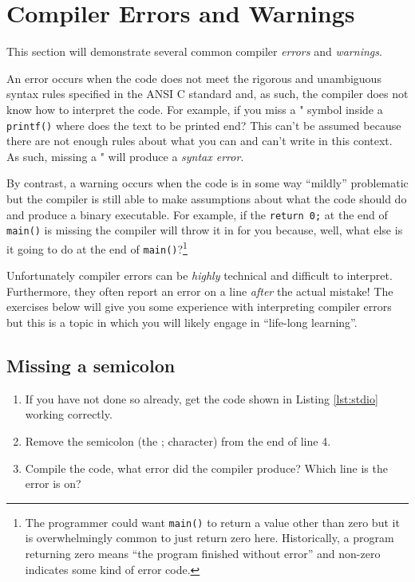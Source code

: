 \documentclass{lab}
\begin{document}
\pagebreak
\section{Compiler Errors and Warnings}

This section will demonstrate several common compiler \textit{errors} and \textit{warnings}.

An error occurs when the code does not meet the rigorous and unambiguous syntax rules specified in the ANSI C standard and, as such, the compiler does not know how to interpret the code. For example, if you miss a " symbol inside a \texttt{printf()} where does the text to be printed end? This can't be assumed because there are not enough rules about what you can and can't write in this context. As such, missing a " will produce a \textit{syntax error}.

By contrast, a warning occurs when the code is in some way ``mildly'' problematic but the compiler is still able to make assumptions about what the code should do and produce a binary executable. For example, if the \texttt{return 0;} at the end of \texttt{main()} is missing the compiler will throw it in for you because, well, what else is it going to do at the end of \texttt{main()}?\footnote{The programmer could want \texttt{main()} to return a value other than zero but it is overwhelmingly common to just return zero here. Historically, a program returning zero means ``the program finished without error'' and non-zero indicates some kind of error code.}

Unfortunately compiler errors can be \textit{highly} technical and difficult to interpret. Furthermore, they often report an error on a line \textit{after} the actual mistake! The exercises below will give you some experience with interpreting compiler errors but this is a topic in which you will likely engage in ``life-long learning''.

\subsection{Missing a semicolon}

\begin{task}{}{}
\begin{enumerate}
	\item If you have not done so already, get the code shown in Listing \ref{lst:stdio} working correctly.
	\item Remove the semicolon (the ; character) from the end of line 4.
	\item Compile the code, what error did the compiler produce? Which line is the error is on?
\end{enumerate}
\end{task}
	
\end{document}
